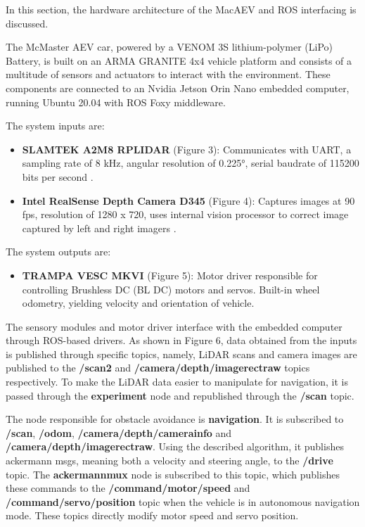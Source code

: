 \documentclass[conference]{IEEEtran}
\begin{document}
In this section, the hardware architecture of the MacAEV and ROS interfacing is discussed.  

The McMaster AEV car, powered by a VENOM 3S lithium-polymer (LiPo) Battery, is built on an ARMA GRANITE 4x4 vehicle platform and consists of a multitude of sensors and actuators to interact with the environment. These components are connected to an Nvidia Jetson Orin Nano embedded computer, running Ubuntu 20.04 with ROS Foxy middleware.

The system inputs are:
\begin{itemize}
    \item \textbf{SLAMTEK A2M8 RPLIDAR} (Figure 3): Communicates with UART, a sampling rate of 8 kHz, angular resolution of \ang{0.225}, serial baudrate of 115200 bits per second \cite{b6}.
    \item \textbf{Intel RealSense Depth Camera D345} (Figure 4): Captures images at 90 fps, resolution of 1280 x 720, uses internal vision processor to correct image captured by left and right imagers \cite{b7}.
\end{itemize}

The system outputs are:

\begin{itemize}
    \item \textbf{TRAMPA VESC MKVI} (Figure 5): Motor driver responsible for controlling Brushless DC (BL DC) motors and servos. Built-in wheel odometry, yielding velocity and orientation of vehicle.
\end{itemize} 

The sensory modules and motor driver interface with the embedded computer through ROS-based drivers. As shown in Figure 6, data obtained from the inputs is published through specific topics, namely, LiDAR scans and camera images are published to the \textbf{/scan2} and \textbf{/camera/depth/image\textunderscore rect\textunderscore raw} topics respectively. To make the LiDAR data easier to manipulate for navigation, it is passed through the \textbf{experiment} node and republished through the \textbf{/scan} topic. 

The node responsible for obstacle avoidance is \textbf{navigation}. It is subscribed to \textbf{/scan}, \textbf{/odom}, \textbf{/camera/depth/camera\textunderscore info} and \textbf{/camera/depth/image\textunderscore rect\textunderscore raw}. Using the described algorithm, it publishes ackermann msgs, meaning both a velocity and steering angle, to the \textbf{/drive} topic. The \textbf{ackermann\textunderscore mux} node is subscribed to this topic, which publishes these commands to the \textbf{/command/motor/speed} and \textbf{/command/servo/position} topic when the vehicle is in autonomous navigation mode. These topics directly modify motor speed and servo position. 
\end{document}
